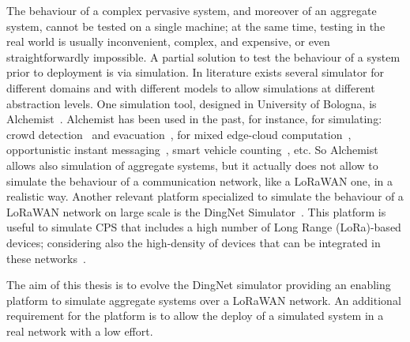 The behaviour of a complex pervasive system, and moreover of an aggregate system, cannot be tested on a single machine; at the same time, testing in the real world is usually inconvenient, complex, and expensive, or even straightforwardly impossible.
A partial solution to test the behaviour of a system prior to deployment is via simulation.
In literature exists several simulator for different domains and with different models to allow simulations at different abstraction levels.
One simulation tool, designed in University of Bologna, is Alchemist~\cite{PianiniJOS2013}.
Alchemist has been used in the past, for instance, for simulating: crowd detection~\cite{FGCS2017, TOMACS2018} and evacuation~\cite{DBLP:journals/corr/abs-1711-08297}, for mixed edge-cloud computation~\cite{Coordination2019-sgcg}, opportunistic instant messaging~\cite{Coordination2019-processes}, smart vehicle counting~\cite{Viroli2016}, etc.
So Alchemist allows also simulation of aggregate systems, but it actually does not allow to simulate the behaviour of a communication network, like a LoRaWAN one, in a realistic way.
Another relevant platform specialized to simulate the behaviour of a LoRaWAN network on large scale is the DingNet Simulator~\cite{inproceedings}.
This platform is useful to simulate CPS that includes a high number of Long Range (LoRa)-based devices; considering also the high-density of devices that can be integrated in these networks~\cite{Lavric2019}. 

The aim of this thesis is to evolve the DingNet simulator providing an enabling platform to simulate aggregate systems over a LoRaWAN network. 
An additional requirement for the platform is to allow the deploy of a simulated system in a real network with a low effort.



%
